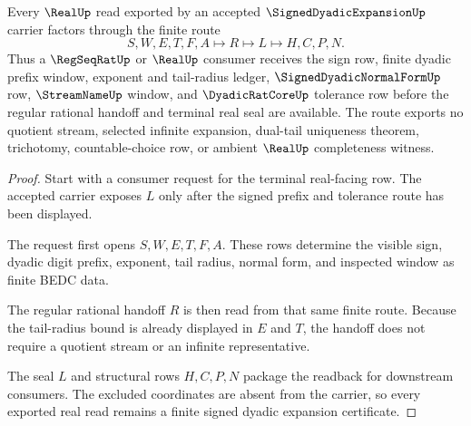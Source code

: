 \begin{theorem}
\label{thm:signed-dyadic-expansion-real-readback}
Every $\RealUp$ read exported by an accepted $\SignedDyadicExpansionUp$ carrier factors through the finite route
$$
S,W,E,T,F,A \longmapsto R \longmapsto L \longmapsto H,C,P,N .
$$
Thus a $\RegSeqRatUp$ or $\RealUp$ consumer receives the sign row, finite dyadic prefix window, exponent and tail-radius ledger, $\SignedDyadicNormalFormUp$ row, $\StreamNameUp$ window, and $\DyadicRatCoreUp$ tolerance row before the regular rational handoff and terminal real seal are available. The route exports no quotient stream, selected infinite expansion, dual-tail uniqueness theorem, trichotomy, countable-choice row, or ambient $\RealUp$ completeness witness.
\end{theorem}
\begin{proof}
Start with a consumer request for the terminal real-facing row. The accepted carrier exposes $L$ only after the signed prefix and tolerance route has been displayed.

The request first opens $S,W,E,T,F,A$. These rows determine the visible sign, dyadic digit prefix, exponent, tail radius, normal form, and inspected window as finite BEDC data.

The regular rational handoff $R$ is then read from that same finite route. Because the tail-radius bound is already displayed in $E$ and $T$, the handoff does not require a quotient stream or an infinite representative.

The seal $L$ and structural rows $H,C,P,N$ package the readback for downstream consumers. The excluded coordinates are absent from the carrier, so every exported real read remains a finite signed dyadic expansion certificate.
\end{proof}



